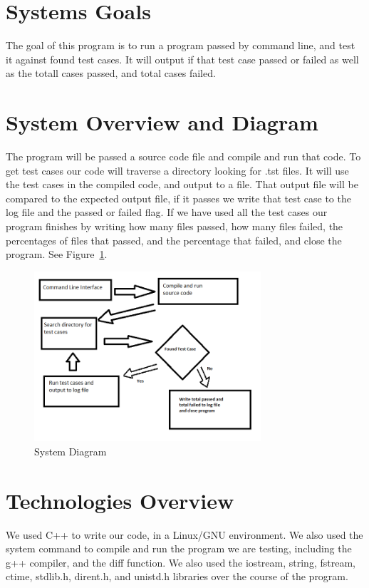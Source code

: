 \section{Systems Goals}
The goal of this program is to run a program passed by command line, and test it
against found test cases. It will output if that test case passed or failed as well as
the totall cases passed, and total cases failed.

\section{System Overview and Diagram}
The program will be passed a source code file and compile and run that code.   To get test cases our
code will traverse a directory looking for .tst files.   It will use the test cases in the compiled code,
and output to a file.   That output file will be compared to the expected output file, if it passes we
write that test case to the log file and the passed or failed flag.   If we have used all the test cases
our program finishes by writing how many files passed, how many files failed, the percentages of
files that passed, and the percentage that failed, and close the program.   See Figure~\ref{systemdiagram}.

\begin{figure}[tbh]
\begin{center}
\includegraphics[width=0.75\textwidth]{./diagram}
\end{center}
\caption{System Diagram \label{systemdiagram}}
\end{figure}

\section{Technologies Overview}
We used C++ to write our code, in a Linux/GNU environment. We also used the system command to compile
and run the program we are testing, including the g++ compiler, and the diff function. We also used the iostream,
string, fstream, ctime, stdlib.h, dirent.h, and unistd.h libraries over the course of the program.

